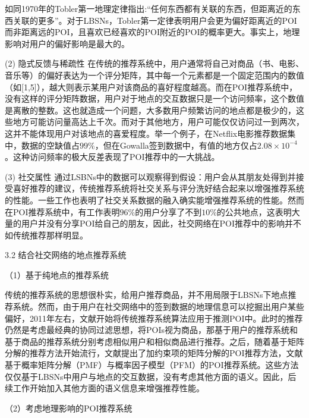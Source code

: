 \documentclass[a4paper,11pt]{article}
\theoremstyle{mytheor}
\begin{document}
如同1970年的Tobler第一地理定律指出:“任何东西都有关联的东西，但距离近的东西关联的更多”\cite{tobler1970computer}。对于LBSNs，Tobler第一定律表明用户会更为偏好距离近的POI而非距离远的POI，且喜欢已经喜欢的POI附近的POI的概率更大。事实上，地理影响对用户的偏好影响是最大的。

(2)	隐式反馈与稀疏性
在传统的推荐系统中，用户通常将自己对商品（书、电影、音乐等）的偏好表达为一个评分矩阵，其中每一个元素都是一个固定范围内的数值（如[1,5]），越大则表示某用户对该商品的喜好程度越高。而在POI推荐系统中，没有这样的评分矩阵数据，用户对于地点的交互数据只是一个访问频率，这个数值是离散的整数。这也就造成一个问题，大多数用户频繁访问的地点都是极少的，这些地方可能访问量高达上千次。而对于其他地方，用户可能仅仅访问过一到两次，这并不能体现用户对该地点的喜爱程度。举一个例子，在Netflix电影推荐数据集中，数据的空缺值占$99\%$，但在Gowalla签到数据中，有值的地方仅占$2.08\times10^{-4}$。这种访问频率的极大反差表现了POI推荐中的一大挑战。

(3)	社交属性
通过LSBNs中的数据可以观察得到假设：用户会从其朋友处得到并接受喜好推荐的建议，传统推荐系统将社交关系与评分洗好结合起来以增强推荐系统的性能。一些工作\cite{jamali2010matrix,ma2008sorec}也表明了社交关系数据的融入确实能增强推荐系统的性能。然而在POI推荐系统中，有工作\cite{ye2010location}表明$96\%$的用户分享了不到$10\%$的公共地点，这表明大量的用户并没有分享POI给自己的朋友，因此，社交网络在POI推荐中的影响并不如传统推荐那样明显。


3.2 结合社交网络的地点推荐系统

（1）基于纯地点的推荐系统

传统的推荐系统的思想很朴实，给用户推荐商品，并不用局限于LBSNs下地点推荐系统。然而，由于用户在社交网络中的签到数据的地理信息可以挖掘出用户某些偏好，2011年左右，文献\cite{ye2011exploiting,berjani2011recommendation}开始将传统推荐系统算法应用于推测POI中。此时的推荐仍然是考虑最经典的协同过滤思想，将POIs视为商品，那基于用户的推荐系统\cite{breese1998empirical}和基于商品的推荐系统\cite{sarwar2001item,linden2003amazon}分别考虑相似用户和相似商品进行推荐。之后，随着基于矩阵分解的推荐方法开始流行\cite{mnih2008probabilistic,lee2001algorithms,koren2009matrix}，文献\cite{berjani2011recommendation}提出了加约束项的矩阵分解的POI推荐方法，文献\cite{cheng2012fused}基于概率矩阵分解（PMF）与概率因子模型（PFM）的POI推荐系统。这些方法仅仅基于LBSNs中用户与地点的交互数据，没有考虑其他方面的语义。因此，后续工作开始加入其他方面的语义信息来增强推荐性能。

（2）考虑地理影响的POI推荐系统
\end{document}
